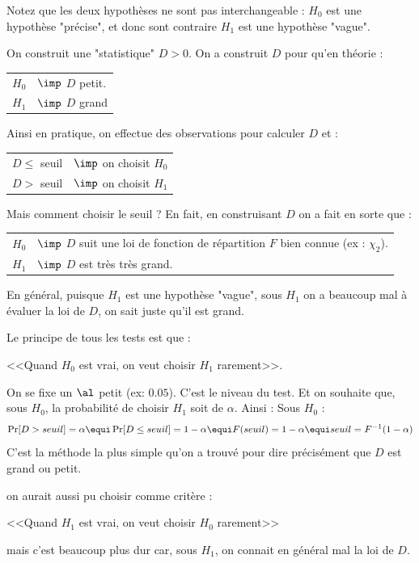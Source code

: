 \documentclass{article}
\begin{document}
Notez que les deux hypothèses ne sont pas interchangeable : $H_0$ est une hypothèse "précise", et donc sont contraire $H_1$ est une hypothèse "vague". 


On construit une "statistique" $D>0$.  On a construit $D$ pour qu'en théorie :

\begin{tabular}{ll}
$H_0$  &$\imp$  $D$ petit. \\
$H_1$  &$\imp$  $D$ grand
\end{tabular}

Ainsi en pratique, on effectue des observations pour calculer $D$ et :

\begin{tabular}{ll}
$D \leq$ seuil  &$\imp$    on choisit $H_0$ \\
$D >$  seuil &$\imp$   on choisit $H_1$
\end{tabular}

Mais comment choisir le seuil ?  En fait, en construisant $D$ on a fait en sorte que :

\begin{tabular}{ll}
$H_0$  &$\imp$  $D$ suit une loi de fonction de répartition $F$ bien connue (ex :   $\chi_2$). \\
$H_1$  &$\imp$  $D$ est très très grand. 
\end{tabular}

En général, puisque $H_1$ est une hypothèse "vague",  sous $H_1$ on a beaucoup mal à évaluer la loi de $D$, on sait juste qu'il est grand.



Le principe de tous les tests est que : 
\begin{center}
<<Quand $H_0$ est vrai, on veut choisir $H_1$ rarement>>. 
\end{center}
On se fixe  un $\al$ petit (ex: $0.05$). C'est le niveau du test.  Et on souhaite que, sous $H_0$, la probabilité de choisir $H_1$ soit de $\alpha$.  Ainsi : Sous $H_0$ :
$$
\Pr[D>seuil] = \alpha  \equi  \Pr[D\leq seuil] = 1-\alpha \equi F(seuil) = 1-\alpha \equi  seuil = F^{-1} (1-\alpha)
$$
C'est la méthode la plus simple qu'on a trouvé pour dire précisément que  $D$ est grand ou petit. 


\begin{remarque} on aurait aussi pu choisir comme critère :
\begin{center}
 <<Quand $H_1$ est vrai, on veut choisir $H_0$ rarement>> 
\end{center}
mais c'est beaucoup plus dur car, sous $H_1$, on connait en général mal la loi de $D$.
\end{remarque}
\end{document}
